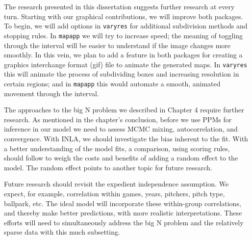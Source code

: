 The research presented in this dissertation suggests further research at every turn. Starting with our graphical contributions, we will improve both packages. To begin,  we will add options in \verb|varyres| for additional subdivision methods and stopping rules. In \verb|mapapp| we will try to increase speed; the meaning of toggling through the interval will be easier to understand if the image changes more smoothly. In this vein, we plan to add a feature in both packages for creating a graphics interchange format (gif) file to animate the generated maps. In \verb|varyres| this will animate the process of subdividing boxes and increasing resolution in certain regions; and in \verb|mapapp| this would automate a smooth, animated movement through the interval.

The approaches to the big N problem we described in Chapter 4 require further research. As mentioned in the chapter's conclusion, before we use PPMs for inference in our model we need to assess MCMC mixing, autocorrelation, and convergence. With INLA, we should investigate the bias inherent to the fit. With a better understanding of the model fits, a comparison, using scoring rules, should follow to weigh the costs and benefits of adding a random effect to the model. The random effect points to another topic for future research.

Future research should revisit the expedient independence assumption. We expect, for example, correlation within games, years, pitchers, pitch type, ballpark, etc. The ideal model will incorporate these within-group correlations, and thereby make better predictions, with more realistic interpretations. These efforts will need to simultaneously address the big N problem and the relatively sparse data with this much subsetting.



